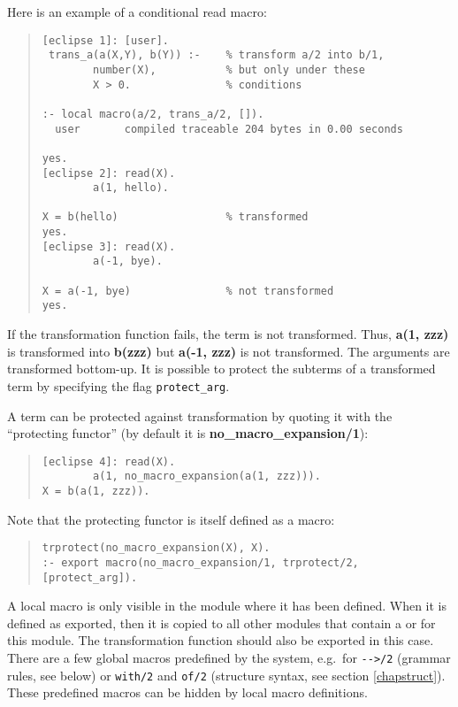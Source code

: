 Here is an example of a conditional read macro:
\begin{quote}
\begin{verbatim}
[eclipse 1]: [user].
 trans_a(a(X,Y), b(Y)) :-    % transform a/2 into b/1,
        number(X),           % but only under these
        X > 0.               % conditions

:- local macro(a/2, trans_a/2, []).
  user       compiled traceable 204 bytes in 0.00 seconds

yes.
[eclipse 2]: read(X).
        a(1, hello).

X = b(hello)                 % transformed
yes.
[eclipse 3]: read(X).
        a(-1, bye).

X = a(-1, bye)               % not transformed
yes.
\end{verbatim}
\end{quote}
If the transformation function fails, the term is not transformed. Thus, 
{\bf a(1, zzz)} is transformed into {\bf b(zzz)} but {\bf a(-1, zzz)} 
is not transformed.
The arguments are transformed bottom-up. It is possible to protect the 
subterms of a transformed term by specifying the flag {\tt protect_arg}.

A term can be protected against transformation by quoting it with 
the ``protecting functor'' (by default it is {\bf no_macro_expansion/1}):
\begin{quote}
\begin{verbatim}
[eclipse 4]: read(X).
        a(1, no_macro_expansion(a(1, zzz))).
X = b(a(1, zzz)).
\end{verbatim}
\end{quote}
Note that the protecting functor is itself defined as a macro:
\begin{quote} \begin{verbatim}
trprotect(no_macro_expansion(X), X).
:- export macro(no_macro_expansion/1, trprotect/2, [protect_arg]).
\end{verbatim} \end{quote}

A local macro is only visible in the module where it has been defined.
When it is defined as exported, then it is copied to all
other modules that contain a
 or
for this module.
The transformation function should also be exported in this case.
There are a few global macros predefined by the system, e.g.\ for
{\tt -}{\tt ->/2} (grammar rules, see below) or {\tt with/2} and {\tt of/2}
(structure syntax, see section \ref{chapstruct}).
These predefined macros can be hidden by local macro definitions.

